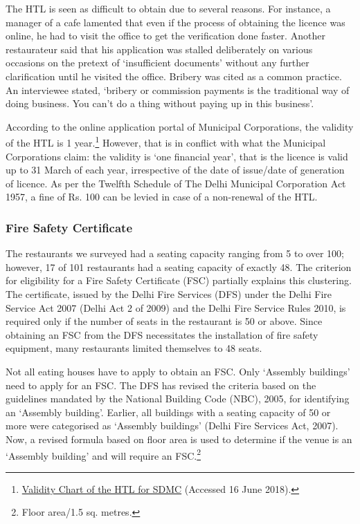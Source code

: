 \documentclass[a4paper, 12pt]{article}
\begin{document}
                    The HTL is seen as difficult to obtain due to several reasons. For instance, a manager of a cafe lamented that even if the process of obtaining the licence was online, he had to visit the office to get the verification done faster. Another restaurateur said 
that his application was stalled deliberately on various occasions on the pretext of ‘insufficient documents’ without any further clarification until he visited the office. Bribery was cited as a common practice. An interviewee stated, ‘bribery or commission payments is 
the traditional way of doing business. You can’t do a thing without paying up in this business’.
                    
                    According to the online application portal of Municipal Corporations, the validity of the HTL is 1 year.\footnote{\href{https://bit.ly/2Qzd92r}{Validity Chart of the HTL for SDMC} (Accessed 16 June 2018).} However, that is in conflict with what the Municipal Corporations claim: the validity is ‘one financial year’, that is the licence is valid up to 31 March of each year, irrespective of the date of issue/date of generation of licence. As per the Twelfth Schedule of The Delhi Municipal Corporation Act 1957, a fine of Rs. 100 can be levied in case of a non-renewal of the HTL. %
  
     
		\subsubsection{Fire Safety Certificate}
		The restaurants we surveyed had a seating capacity ranging from 5 to over 100; however, 17 of 101 restaurants had a seating capacity of exactly 48. The criterion for eligibility for a Fire Safety Certificate (FSC) partially explains this clustering. The 
certificate, issued by the Delhi Fire Services (DFS) under the Delhi Fire Service Act 2007 (Delhi Act 2 of 2009) and the Delhi Fire Service Rules 2010, is required only if the number of seats in the restaurant is 50 or above. Since obtaining an FSC from the DFS 
necessitates the installation of fire safety equipment, many restaurants limited themselves to 48 seats. %
		
		Not all eating houses have to apply to obtain an FSC. Only ‘Assembly buildings’ need to apply for an FSC. The DFS has revised the criteria based on the guidelines mandated by the National Building Code (NBC), 2005, for identifying an ‘Assembly 
building’. Earlier, all buildings with a seating capacity of 50 or more were categorised as ‘Assembly buildings’ (Delhi Fire Services Act, 2007). Now, a revised formula based on floor area is used to determine if the venue is an ‘Assembly building’ and will require an 
FSC.\footnote{Floor area/1.5 sq. metres.} 
		
\end{document}
